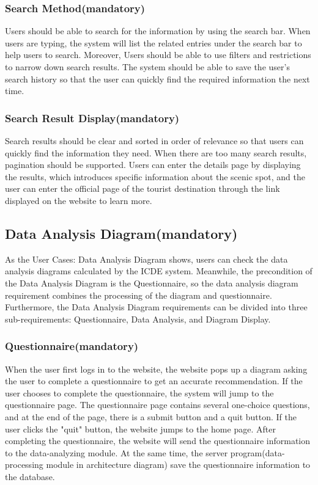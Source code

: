 \documentclass[conference]{IEEEtran}
\begin{document}
\subsubsection{ Search Method(mandatory) }

Users should be able to search for the information by using the search 
bar. When users are typing, the system will list the related entries under the 
search bar to help users to search. Moreover, Users should be able to use 
filters and restrictions to narrow down search results. The system should be 
able to save the user's search history so that the user can quickly find the 
required information the next time.

\subsubsection{ Search Result Display(mandatory) }

Search results should be clear and sorted in order of relevance so that 
users can quickly find the information they need. When there are too many 
search results, pagination should be supported. Users can enter the details 
page by displaying the results, which introduces specific information about 
the scenic spot, and the user can enter the official page of the tourist 
destination through the link displayed on the website to learn more.

\subsection{ Data Analysis Diagram(mandatory) }

As the User Cases: Data Analysis Diagram shows, users can check the 
data analysis diagrams calculated by the ICDE system. Meanwhile, the precondition of the Data Analysis Diagram is the Questionnaire, 
so the data analysis diagram requirement combines the processing of the diagram and questionnaire. Furthermore, the Data Analysis
Diagram requirements can be divided into three sub-requirements: Questionnaire, Data Analysis, and Diagram Display.

\subsubsection{ Questionnaire(mandatory) }

When the user first logs in to the website, the website pops up a diagram asking the user to complete a questionnaire to 
get an accurate recommendation. If the user chooses 
to complete the questionnaire, the system will jump to the questionnaire page. The questionnaire page contains several one-choice questions, and
at the end of the page, there is a submit button and a quit button. If the user clicks the "quit" button, the website jumps to the home page.
After completing the questionnaire, the website will send the 
questionnaire information to the data-analyzing module. At the same time, the server program(data-processing module in architecture diagram) 
save the questionnaire information to the database.
\end{document}
